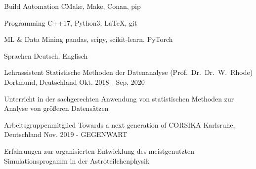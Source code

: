 \documentclass[11pt, a4paper]{Awesome-CV/awesome-cv}
\begin{document}
\begin{cvskills}
    \cvskill
    {Build Automation} %
    {CMake, Make, Conan, pip} %


    \cvskill
    {Programming} %
    {C++17, Python3, LaTeX, git} %

    \cvskill
    {ML \& Data Mining} %
    {pandas, scipy, scikit-learn, PyTorch} %

    \cvskill
    {Sprachen} %
    {Deutsch, Englisch} %
\end{cvskills}

\begin{cventries}
    \cventry
    {Lehrassistent} %
    {Statistische Methoden der Datenanalyse (Prof.~Dr.~Dr.~W.~Rhode)} %
    {Dortmund, Deutschland} %
    {Okt. 2018 - Sep. 2020} %
    {
        \begin{cvitems} %
        \item {Unterricht in der sachgerechten Anwendung von statistischen
            Methoden zur Analyse von größeren Datensätzen}
        \end{cvitems}
    }

    \cventry
    {Arbeitsgruppenmitglied} %
    {Towards a next generation of CORSIKA} %
    {Karlsruhe, Deutschland} %
    {Nov. 2019 - GEGENWART} %
    {
        \begin{cvitems} %
        \item {Erfahrungen zur organisierten Entwicklung des meistgenutzten
            Simulationsprogamm in der Astroteilchenphysik}
        \end{cvitems}
    }
\end{cventries}
\end{document}

